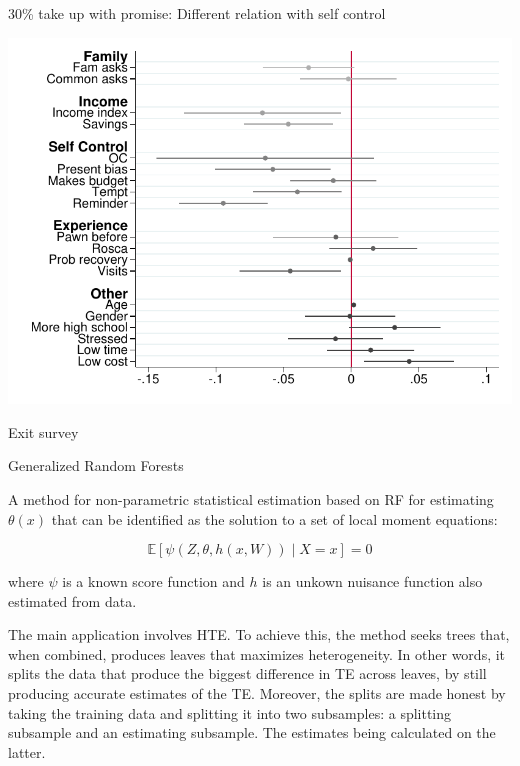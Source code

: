 \documentclass[9pt]{beamer}
\begin{document}
\begin{frame}{30\% take up with promise: Different relation with self control}
    \begin{center}
        \includegraphics[width=.90\textwidth]{Figuras/pago_frec_vol_promise_interactions_rf.pdf}
    \end{center}
\end{frame}




\begin{frame}{Exit survey}
    \begin{center}
    \tiny
    
    \end{center}
\end{frame}



\begin{frame}[label = GRF]{Generalized Random Forests}

A method for non-parametric statistical estimation based on RF
for estimating $\theta(x)$ that can be identified as the solution to a set of local moment equations:

\[\mathbb{E}[\psi(Z,\theta,h(x,W))\;|\;X=x]=0\]

where $\psi$ is a known score function and $h$ is an unkown nuisance function also estimated from data.\\

\vspace{5mm}

The main application involves HTE. To achieve this, the method seeks trees that, when combined, produces leaves that maximizes heterogeneity. In other words, it splits the data that produce the biggest difference in TE across leaves, by still producing accurate estimates of the TE. Moreover, the splits are made honest by taking the training data and splitting it into two subsamples: a splitting subsample and an estimating subsample. The estimates being calculated on the latter. \hyperlink{hte}{}\\

\end{frame}
\end{document}
